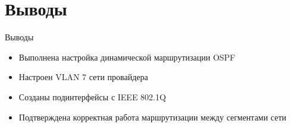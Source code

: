 \documentclass[
  ignorenonframetext,
  aspectratio=169,
  russian,
]{beamer}
\providecommand{\tightlist}{%
  \setlength{\itemsep}{0pt}\setlength{\parskip}{0pt}}
\begin{document}
\section{Выводы}\label{ux432ux44bux432ux43eux434ux44b}

\begin{frame}{Выводы}
\begin{itemize}
\tightlist
\item
  Выполнена настройка динамической маршрутизации OSPF
\item
  Настроен VLAN 7 сети провайдера
\item
  Созданы подинтерфейсы с IEEE 802.1Q
\item
  Подтверждена корректная работа маршрутизации между сегментами сети
\end{itemize}
\end{frame}
\end{document}
